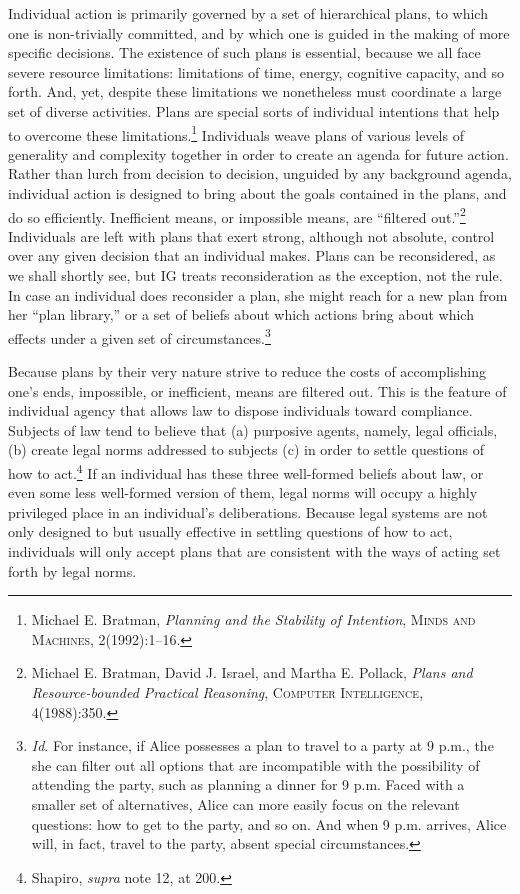 Individual action is primarily governed by a set of hierarchical plans,
to which one is non-trivially committed, and by which one is guided in
the making of more specific decisions. The existence of such plans is
essential, because we all face severe resource limitations: limitations
of time, energy, cognitive capacity, and so forth. And, yet, despite
these limitations we nonetheless must coordinate a large set of diverse
activities. Plans are special sorts of individual intentions that help
to overcome these limitations.\footnote{Michael E. Bratman,
  \emph{Planning and the Stability of Intention}, \textsc{Minds and
  Machines}, 2(1992):1--16.} Individuals weave plans of various levels
of generality and complexity together in order to create an agenda for
future action. Rather than lurch from decision to decision, unguided by
any background agenda, individual action is designed to bring about the
goals contained in the plans, and do so efficiently. Inefficient means,
or impossible means, are ``filtered out.''\footnote{Michael E. Bratman,
  David J. Israel, and Martha E. Pollack, \emph{Plans and
  Resource-bounded Practical Reasoning}, \textsc{Computer Intelligence},
  4(1988):350.} Individuals are left with plans that exert strong,
although not absolute, control over any given decision that an
individual makes. Plans can be reconsidered, as we shall shortly see,
but IG treats reconsideration as the exception, not the rule. In case an
individual does reconsider a plan, she might reach for a new plan from
her ``plan library,'' or a set of beliefs about which actions bring
about which effects under a given set of circumstances.\footnote{\emph{Id}.
  For instance, if Alice possesses a plan to travel to a party at 9
  p.m., the she can filter out all options that are incompatible with
  the possibility of attending the party, such as planning a dinner for
  9 p.m. Faced with a smaller set of alternatives, Alice can more easily
  focus on the relevant questions: how to get to the party, and so on.
  And when 9 p.m. arrives, Alice will, in fact, travel to the party,
  absent special circumstances.}

Because plans by their very nature strive to reduce the costs of
accomplishing one's ends, impossible, or inefficient, means are filtered
out. This is the feature of individual agency that allows law to dispose
individuals toward compliance. Subjects of law tend to believe that (a)
purposive agents, namely, legal officials, (b) create legal norms
addressed to subjects (c) in order to settle questions of how to
act.\footnote{Shapiro, \emph{supra} note 12, at 200.} If an individual
has these three well-formed beliefs about law, or even some less
well-formed version of them, legal norms will occupy a highly privileged
place in an individual's deliberations. Because legal systems are not
only designed to but usually effective in settling questions of how to
act, individuals will only accept plans that are consistent with the
ways of acting set forth by legal norms.

